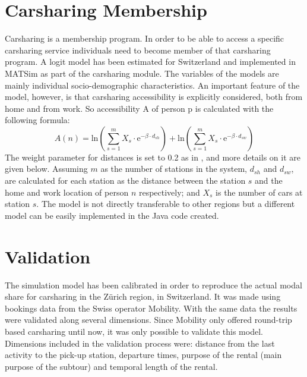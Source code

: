 \section{Carsharing Membership}
Carsharing is a membership program. In order to be able to access a specific carsharing service individuals need to become member of that carsharing program. A logit model has been estimated for Switzerland \citep[][]{CiariWeis_EURO_2014} and implemented in MATSim as part of the carsharing module. The variables of the models are mainly individual socio-demographic characteristics.  
An important feature of the model, however, is that carsharing accessibility is explicitly considered, both from home and from work. So accessibility A of person p is calculated with the following formula:
%
\begin{equation}
A(n) = \mathrm{ln} \left(\sum_{s=1}^m X_s \cdot \mathrm{e}^{-\beta \cdot d_{sh}}\right) + \mathrm{ln} \left(\sum_{s=1}^{m} X_s \cdot \mathrm{e}^{-\beta \cdot d_{sw}}\right)
\end{equation}
%
The weight parameter for distances is set to 0.2 as in \citet[][]{Weis_PhDThesis_2012} , and more details on it are given below. Assuming $m$ as the number of stations in the system, $d_{sh}$ and $d_{sw}$, are calculated for each station as the distance between the station $s$ and the home and work location of person $n$ respectively; and $X_s$ is the number of cars at station $s$. 
The model is not directly transferable to other regions but a different model can be easily implemented in the Java code created. 

\section{Validation}
The simulation model has been calibrated in order to reproduce the actual modal share for carsharing in the Zürich region, in Switzerland. It was made using bookings data from the Swiss operator Mobility. With the same data the results were validated along several dimensions. Since Mobility only offered round-trip based carsharing until now, it was only possible to validate this model. Dimensions included in the validation process were: distance from the last activity to the pick-up station, departure times, purpose of the rental (main purpose of the subtour) and temporal length of the rental. 

